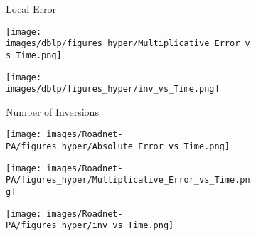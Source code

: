 \begin{figure*}[htbp]
\begin{subfigure}[b]{\textwidth}
\begin{minipage}[b]{0.3\textwidth}
		\end{minipage}%
		\begin{minipage}[b]{0.3\textwidth}
			\centering
			\caption*{Local Error} %
			\texttt{[image: images/dblp/figures\_hyper/Multiplicative\_Error\_vs\_Time.png]} %
			
		\end{minipage}%
		\begin{minipage}[b]{0.3\textwidth}
			\centering
			\caption*{Number of Inversions} %
			\texttt{[image: images/dblp/figures\_hyper/inv\_vs\_Time.png]} %
		\end{minipage}
	\end{subfigure}
	\begin{subfigure}[b]{\textwidth}
		\centering
		\begin{minipage}[b]{0.05\textwidth}
			\centering
		\end{minipage}%
		\begin{minipage}[b]{0.3\textwidth}
			\centering
			\texttt{[image: images/Roadnet-PA/figures\_hyper/Absolute\_Error\_vs\_Time.png]} %
			
		\end{minipage}%
		\begin{minipage}[b]{0.3\textwidth}
			\centering
			
			\texttt{[image: images/Roadnet-PA/figures\_hyper/Multiplicative\_Error\_vs\_Time.png]} %
			
		\end{minipage}%
		\begin{minipage}[b]{0.3\textwidth}
			\centering
			
			\texttt{[image: images/Roadnet-PA/figures\_hyper/inv\_vs\_Time.png]} %
		\end{minipage}
		

\end{subfigure}
\end{figure*}
